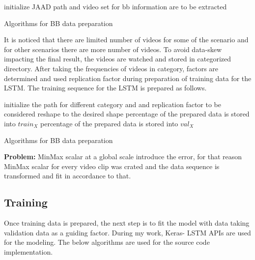 \begin{algorithm}[H]
\SetAlgoLined
{}
 initialize JAAD path and video set for bb information are to be extracted \;
 \caption{Algorithms for BB data preparation}
\end{algorithm}

It is noticed that there are limited number of videos for some of the scenario and for other scenarios there are more number of videos. To avoid data-skew impacting the final result, the videos are watched and stored in categorized directory. After taking the frequencies of videos in category, factors are determined  and used  replication factor during preparation of training data for the LSTM. The training sequence for the LSTM is prepared as follows.

\begin{algorithm}[H]
\SetAlgoLined
{}
 initialize the path for different category and and replication factor to be considered \;
reshape to the desired shape percentage of the prepared data is stored into $train_X$ percentage of the prepared data is stored into $val_X$\;
 \caption{Algorithms for BB data preparation}
\end{algorithm}

\textbf{Problem:} MinMax scalar at a global scale introduce the error, for that reason MinMax scalar for every video clip was crated and the data sequence is transformed and fit in accordance to that.

\subsection{Training }
Once training data is prepared, the next step is to fit the model with data taking validation data as a guiding factor. During my work, Keras- LSTM APIs are used for the modeling. The below algorithms are used for the source code implementation.

